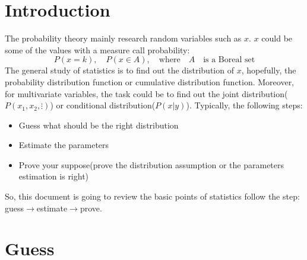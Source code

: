 \documentclass[UTF8]{article} %
\begin{document}
\section{Introduction}
The probability theory mainly research random variables such as $x$. $x$ could be some of the values with a measure call probability:
$$
P(x=k),\quad P(x \in A), \quad\text{where}\quad A \quad\text{is a Boreal set}
$$
The general study of statistics is to find out the distribution of $x$, hopefully, the probability distribution function or cumulative distribution function. Moreover, for multivariate variables, the task could be to find out the joint distribution($P(x_1,x_2,\vdots)$) or conditional distribution($P(x|y)$). Typically, the following steps:
\begin{itemize}
\item Guess what should be the right distribution
\item Estimate the parameters
\item Prove your suppose(prove the distribution assumption or the parameters estimation is right)
\end{itemize}
So, this document is going to review the basic points of statistics follow the step: guess$\rightarrow$estimate$\rightarrow$prove.

\section{Guess}
\end{document}
